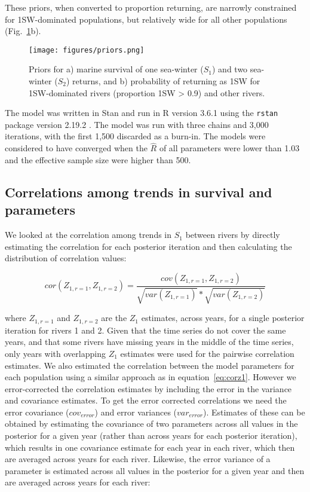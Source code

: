 \documentclass[12pt]{article}
\newcommand{\So}{$S_{1}$\xspace}
\newcommand{\St}{$S_{2}$\xspace}
\newcommand{\comment}[1]{\par {\bfseries \color{blue} #1 \par}} %
\begin{document}
These priors, when converted to proportion returning, are narrowly constrained
for 1SW-dominated populations, but relatively wide for all other populations
(Fig.~\ref{fig:priors}b).

\begin{figure}[htbp] \centering
    \texttt{[image: figures/priors.png]} \caption{Priors
        for a) marine survival of one sea-winter (\So) and two sea-winter
        (\St) returns, and b) probability of returning as 1SW for
        1SW-dominated rivers (proportion 1SW > 0.9) and other rivers.}
    \label{fig:priors} 
\end{figure}


The model was written in Stan \citep{Carpenter2017} and run in R version 3.6.1
\citep{RCoreTeam2019} using the \texttt{rstan} package version 2.19.2
\citep{StanDevelopmentTeam2019}.
The model was run with three chains and 3,000 iterations, with the first 1,500
discarded as a burn-in. The models were considered to have converged when the
$\hat R$ of all parameters were lower than 1.03 and the effective sample size 
were higher than 500.

\subsection*{Correlations among trends in survival and parameters}


We looked at the correlation among trends in \So between rivers by directly estimating the 
correlation for each posterior iteration and then calculating the distribution of correlation values:

\begin{equation}
cor(Z_{1,r=1},Z_{1,r=2}) = \frac{cov(Z_{1,r=1}, Z_{1,r=2})}{\sqrt{var(Z_{1,r=1})}*\sqrt{var(Z_{1,r=2})}}\label{eq:corz1}
\end{equation}

where $Z_{1,r=1}$ and $Z_{1,r=2}$ are the $Z_1$ estimates, across years, for a
single posterior iteration for rivers 1 and 2. 
Given that the time series do not cover the same years, and that some rivers
have missing years in the middle of the time series, only years with overlapping
$Z_1$ estimates were used for the pairwise correlation estimates.
We also estimated the correlation between the model parameters for each population using
a similar approach as in equation~\ref{eq:corz1}. However we error-corrected the correlation estimates
by including the error in the variance and covariance estimates.
To get the error corrected correlations we need the error covariance ($cov_{error}$) and error
variances ($var_{error}$). Estimates of these can be obtained by estimating the covariance of
two parameters across all values in the posterior for a given year (rather
than across years for each posterior iteration), which results in one
covariance estimate for each year in each river, which then are averaged
across years for each river. Likewise, the error variance of a parameter is estimated  
across all values in the posterior for a given year and then are averaged
across years for each river:
\end{document}
